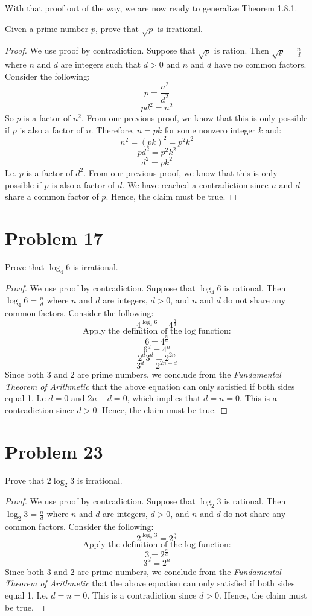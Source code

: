 \documentclass{article}
\begin{document}
With that proof out of the way, we are now ready to generalize Theorem 1.8.1.

Given a prime number $p$, prove that $\sqrt{p}$ is irrational.
\begin{proof}
	We use proof by contradiction. Suppose that $\sqrt{p}$ is ration. Then $\sqrt{p} = \frac{n}{d}$ where $n$ and $d$ are integers such that $d > 0$ and $n$ and $d$ have no common factors. Consider the following:
	\[
		p = \frac{n^2}{d^2}
	\]
	\[
		p d^2 = n^2
	\]
	So $p$ is a factor of $n^2$. From our previous proof, we know that this is only possible if $p$ is also a factor of $n$. Therefore, $n = p k$ for some nonzero integer $k$ and:
	\[
		n^2 = (p k)^2 = p^2 k^2
	\]
	\[
		p d^2 = p^2 k^2
	\]
	\[
		d^2 = p k^2
	\]
	I.e. $p$ is a factor of $d^2$. From our previous proof, we know that this is only possible if $p$ is also a factor of $d$. We have reached a contradiction since $n$ and $d$ share a common factor of $p$. Hence, the claim must be true.
\end{proof}

\pagebreak

\section{Problem 17}
Prove that $\log_4 6$ is irrational.
\begin{proof}
	We use proof by contradiction. Suppose that $\log_4 6$ is rational. Then $\log_4 6 = \frac{n}{d}$ where $n$ and $d$ are integers, $d > 0$, and $n$ and $d$ do not share any common factors. Consider the following:
	\[
		4^{\log_4 6} = 4^{\frac{n}{d}}
	\]
	\[
		\text{Apply the definition of the log function:}
	\]
	\[
		6 = 4^{\frac{n}{d}}
	\]
	\[
		6^d = 4^n
	\]
	\[
		2^d 3^d = 2^{2n}
	\]
	\[
		3^d = 2^{2n - d}
	\]
	Since both $3$ and $2$ are prime numbers, we conclude from the \textit{Fundamental Theorem of Arithmetic} that the above equation can only satisfied if both sides equal 1. I.e $d = 0$ and $2n - d = 0$, which implies that $d = n = 0$.  This is a contradiction since $d > 0$. Hence, the claim must be true.
\end{proof}

\pagebreak

\section{Problem 23}
Prove that $2 \log_2 3$ is irrational.
\begin{proof}
	We use proof by contradiction. Suppose that $\log_2 3$ is rational. Then $\log_2 3 = \frac{n}{d}$ where $n$ and $d$ are integers, $d > 0$, and $n$ and $d$ do not share any common factors. Consider the following:
	\[
		2^{\log_2 3} = 2^{\frac{n}{d}}
	\]
	\[
		\text{Apply the definition of the log function:}
	\]
	\[
		3 = 2^{\frac{n}{d}}
	\]
	\[
		3^d = 2^n
	\]
	Since both $3$ and $2$ are prime numbers, we conclude from the \textit{Fundamental Theorem of Arithmetic} that the above equation can only satisfied if both sides equal 1. I.e. $d = n = 0$. This is a contradiction since $d > 0$. Hence, the claim must be true.
\end{proof}
\end{document}
